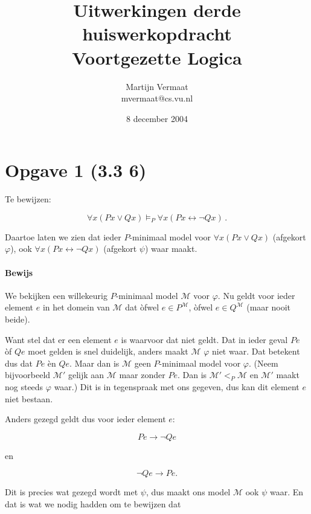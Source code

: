 \documentclass[a4paper,11pt]{article}
\title{Uitwerkingen derde huiswerkopdracht\\Voortgezette Logica}
\author{
    Martijn Vermaat\\
    mvermaat@cs.vu.nl
}
\date{8 december 2004}
\begin{document}
\maketitle


\section*{Opgave 1 (3.3 6)}

Te bewijzen:

\begin{displaymath}
\forall x (Px \vee Qx) \vDash_{P} \forall x (Px \leftrightarrow \neg Qx) \, \mbox{.}
\end{displaymath}

Daartoe laten we zien dat ieder $P$-minimaal model voor $\forall x (Px \vee
Qx)$ (afgekort $\varphi$), ook $\forall x (Px \leftrightarrow \neg
Qx)$ (afgekort $\psi$) waar maakt.

\paragraph{Bewijs}

We bekijken een willekeurig $P$-minimaal model $\mathcal{M}$ voor
$\varphi$. Nu geldt voor ieder element $e$ in het domein van $\mathcal{M}$ dat
\`ofwel $e \in P^{\mathcal{M}}$, \`ofwel $e \in Q^{\mathcal{M}}$ (maar nooit beide).

Want stel dat er een element $e$ is waarvoor dat niet geldt. Dat in ieder
geval $Pe$ \`of $Qe$ moet gelden is snel duidelijk, anders maakt $\mathcal{M}$
$\varphi$ niet waar. Dat betekent dus dat $Pe$ \`en $Qe$. Maar dan is
$\mathcal{M}$ geen $P$-minimaal model voor $\varphi$. (Neem bijvoorbeeld
$\mathcal{M}'$ gelijk aan $\mathcal{M}$ maar zonder $Pe$. Dan is $\mathcal{M}'
<_{P} \mathcal{M}$ en $\mathcal{M}'$ maakt nog steeds $\varphi$ waar.) Dit is
in tegenspraak met ons gegeven, dus kan dit element $e$ niet bestaan.

Anders gezegd geldt dus voor ieder element $e$:

\begin{displaymath}
Pe \rightarrow \neg Qe
\end{displaymath}

en

\begin{displaymath}
\neg Qe \rightarrow Pe \mbox{.}
\end{displaymath}

Dit is precies wat gezegd wordt met $\psi$, dus maakt ons model $\mathcal{M}$
ook $\psi$ waar. En dat is wat we nodig hadden om te bewijzen dat
\end{document}
